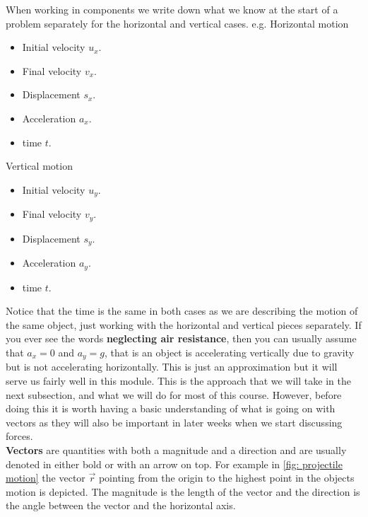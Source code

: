 \documentclass[a4paper,12pt]{book}
\begin{document}
When working in components we write down what we know at the start of a problem separately for the horizontal and vertical cases. e.g. Horizontal motion
    \begin{itemize}
    \setlength{\itemsep}{-5pt}
    \item Initial velocity $u_{x}$.
    \item Final velocity $v_{x}$.
    \item Displacement $s_{x}$.
    \item Acceleration $a_{x}$.
    \item time $t$.
\end{itemize}
Vertical motion
 \begin{itemize}
    \setlength{\itemsep}{-5pt}
    \item Initial velocity $u_{y}$.
    \item Final velocity $v_{y}$.
    \item Displacement $s_{y}$.
    \item Acceleration $a_{y}$.
    \item time $t$.
\end{itemize}
Notice that the time is the same in both cases as we are describing the motion of the same object, just working with the horizontal and vertical pieces separately. If you ever see the words \textbf{neglecting air resistance}, then you can usually assume that $a_{x}=0$ and $a_{y}=g$, that is an object is accelerating vertically due to gravity but is not accelerating horizontally. This is just an approximation but it will serve us fairly well in this module. This is the approach that we will take in the next subsection, and what we will do for most of this course. However, before doing this it is worth having a basic understanding of what is going on with vectors as they will also be important in later weeks when we start discussing forces.\\


\textbf{Vectors} are quantities with both a magnitude and a direction and are usually denoted in either bold or with an arrow on top. For example in \cref{fig: projectile motion} the vector $\vec{r}$ pointing from the origin to the highest point in the objects motion is depicted. The magnitude is the length of the vector and the direction is the angle between the vector and the horizontal axis.\\
\end{document}
